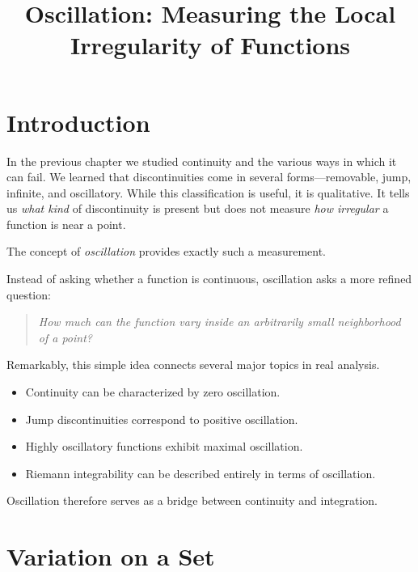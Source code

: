 \documentclass{essay}
\title{Oscillation: Measuring the Local Irregularity of Functions}
\author{}
\date{}
\begin{document}
\maketitle
\tableofcontents


\section{Introduction}

In the previous chapter we studied continuity and the various ways in which it
can fail. We learned that discontinuities come in several forms---removable,
jump, infinite, and oscillatory. While this classification is useful, it is
qualitative. It tells us \emph{what kind} of discontinuity is present but does
not measure \emph{how irregular} a function is near a point.

The concept of \emph{oscillation} provides exactly such a measurement.

Instead of asking whether a function is continuous, oscillation asks a more
refined question:

\begin{quote}
  \emph{How much can the function vary inside an arbitrarily small neighborhood
  of a point?}
\end{quote}

Remarkably, this simple idea connects several major topics in real analysis.

\begin{itemize}
  \item Continuity can be characterized by zero oscillation.
  \item Jump discontinuities correspond to positive oscillation.
  \item Highly oscillatory functions exhibit maximal oscillation.
  \item Riemann integrability can be described entirely in terms of oscillation.
\end{itemize}

Oscillation therefore serves as a bridge between continuity and integration.


\section{Variation on a Set}
\end{document}
